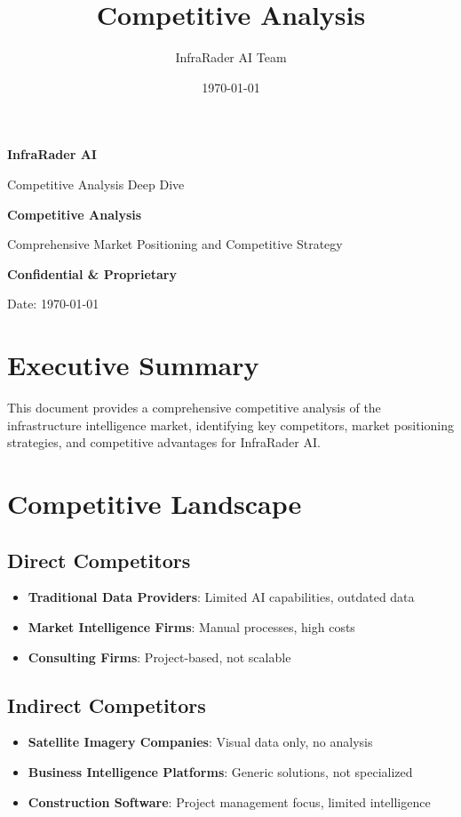 \documentclass[business]{../templates/infraradar-main}
\title{Competitive Analysis}
\author{InfraRader AI Team}
\date{\today}
\begin{document}
\begin{titlepage}
    \centering
    \vspace*{2cm}
    {\Huge\bfseries\color{infraradar@primary} InfraRader AI\par}
    \vspace{0.5cm}
    {\Large\color{infraradar@text} Competitive Analysis Deep Dive\par}
    \vspace{2cm}
    {\huge\bfseries Competitive Analysis\par}
    \vspace{1cm}
    {\large Comprehensive Market Positioning and Competitive Strategy\par}
    \vspace{2cm}
    {\large\bfseries\color{infraradar@primary} Confidential \& Proprietary\par}
    {\large Date: \today\par}
\end{titlepage}

\tableofcontents
\newpage

\section{Executive Summary}

This document provides a comprehensive competitive analysis of the infrastructure intelligence market, identifying key competitors, market positioning strategies, and competitive advantages for InfraRader AI.

\section{Competitive Landscape}

\subsection{Direct Competitors}
\begin{itemize}
    \item \textbf{Traditional Data Providers}: Limited AI capabilities, outdated data
    \item \textbf{Market Intelligence Firms}: Manual processes, high costs
    \item \textbf{Consulting Firms}: Project-based, not scalable
\end{itemize}

\subsection{Indirect Competitors}
\begin{itemize}
    \item \textbf{Satellite Imagery Companies}: Visual data only, no analysis
    \item \textbf{Business Intelligence Platforms}: Generic solutions, not specialized
    \item \textbf{Construction Software}: Project management focus, limited intelligence
\end{itemize}
\end{document}
